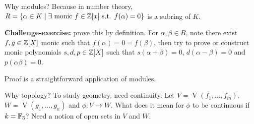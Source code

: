     Why modules? Because in number theory, $R = \{\alpha \in K \mid \exists \  \text{monic }f \in \mathbb{Z}[x] \text{ s.t. } f(\alpha) = 0\}$ is a subring of $K$. \par
    \textbf{Challenge-exercise:} prove this by definition. For $\alpha,\beta \in R$, note there exist $f,g \in \mathbb{Z}[X]$ monic such that $f(\alpha) = 0 = f(\beta)$, then try to prove or construct monic polynomials $s,d,p \in \mathbb{Z}[X]$ such that $s(\alpha + \beta) = 0$, $d(\alpha-\beta) = 0$ and $p(\alpha \beta) = 0$. \par
    Proof is a straightforward application of modules. \par
    Why topology? To study geometry, need continuity. Let $V = \operatorname{V}(f_1,\ldots,f_m)$, $W = \operatorname{V}(g_1,\ldots,g_n)$ and $\phi: V \to W$. What does it mean for $\phi$ to be continuous if $k = \mathbb{F}_3$? Need a notion of open sets in $V$ and $W$.

